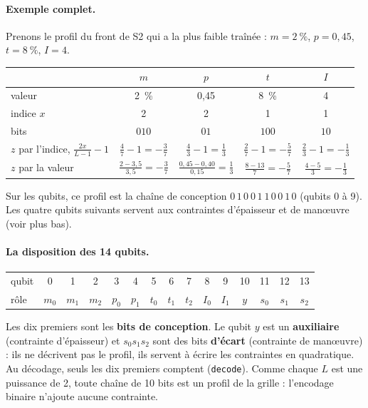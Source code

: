 \paragraph{Exemple complet.} Prenons le profil du front de S2 qui a la plus faible traînée : $m=2~\%$, $p=0{,}45$, $t=8~\%$, $I=4$.
\begin{center}
\renewcommand{\arraystretch}{1.2}
\begin{tabular}{lcccc}
\toprule
& $m$ & $p$ & $t$ & $I$ \\
\midrule
valeur & 2~\% & 0,45 & 8~\% & 4 \\
indice $x$ & 2 & 2 & 1 & 1 \\
bits & $010$ & $01$ & $100$ & $10$ \\
$z$ par l'indice, $\frac{2x}{L-1}-1$ & $\frac47-1=-\frac37$ & $\frac43-1=\frac13$ & $\frac27-1=-\frac57$ & $\frac23-1=-\frac13$ \\
$z$ par la valeur & $\frac{2-3{,}5}{3{,}5}=-\frac37$ & $\frac{0{,}45-0{,}40}{0{,}15}=\frac13$ & $\frac{8-13}{7}=-\frac57$ & $\frac{4-5}3=-\frac13$ \\
\bottomrule
\end{tabular}
\end{center}
Sur les qubits, ce profil est la chaîne de conception $0\,1\,0\ 0\,1\ 1\,0\,0\ 1\,0$ (qubits 0 à 9). Les quatre qubits suivants servent aux contraintes d'épaisseur et de manœuvre (voir plus bas).

\paragraph{La disposition des 14 qubits.}
\begin{center}
\renewcommand{\arraystretch}{1.2}
\begin{tabular}{l*{14}{c}}
\toprule
qubit & 0 & 1 & 2 & 3 & 4 & 5 & 6 & 7 & 8 & 9 & 10 & 11 & 12 & 13 \\
rôle & $m_0$ & $m_1$ & $m_2$ & $p_0$ & $p_1$ & $t_0$ & $t_1$ & $t_2$ & $I_0$ & $I_1$ & $y$ & $s_0$ & $s_1$ & $s_2$ \\
\bottomrule
\end{tabular}
\end{center}
Les dix premiers sont les \textbf{bits de conception}. Le qubit $y$ est un \textbf{auxiliaire} (contrainte d'épaisseur) et $s_0s_1s_2$ sont des bits \textbf{d'écart} (contrainte de manœuvre) : ils ne décrivent pas le profil, ils servent à écrire les contraintes en quadratique. Au décodage, seuls les dix premiers comptent (\texttt{decode}). Comme chaque $L$ est une puissance de 2, toute chaîne de 10 bits est un profil de la grille : l'encodage binaire n'ajoute aucune contrainte.

